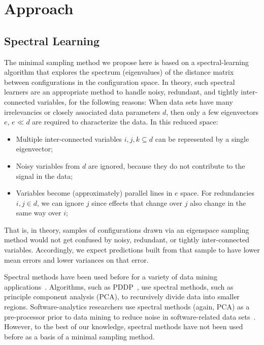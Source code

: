 \documentclass[smallextended]{svjour3}       %
\begin{document}
 \section{Approach}

\subsection{Spectral Learning}\label{sect:spect}

The minimal sampling method we propose here is based on a spectral-learning algorithm
that  explores the spectrum (eigenvalues) of the distance matrix between  configurations in the configuration space.
In theory, such spectral learners are an appropriate method to handle noisy, redundant, and tightly inter-connected variables, for the following reasons:
When data sets have many irrelevancies or closely associated data parameters $d$, then
only a few eigenvectors $e$, $e \ll d$  are required to characterize the data.
In this reduced space:
\begin{itemize}
\item
Multiple inter-connected variables $i,j,k \subseteq d$ can be represented
by a single eigenvector;
\item
Noisy variables from $d$ are
ignored, because they  do not contribute to the signal in the data;
\item
Variables  become (approximately) parallel lines
in $e$ space. For  redundancies \mbox{$i,j \in d$}, we
can ignore $j$
since effects that change over $j$ also
change in the same way over $i$;
\end{itemize}
That is, in theory, samples of configurations drawn via an eigenspace sampling method
would not get confused by noisy, redundant, or tightly inter-connected variables. Accordingly,
we expect predictions built from that sample to have  lower mean errors and lower variances on that error.

Spectral methods have been used before for a variety of data mining applications~\cite{kamvar2003spectral}.
Algorithms, such as PDDP~\cite{boley98}, use spectral methods, such as principle component analysis (PCA), to
recursively divide data into smaller regions.  Software-analytics researchers use spectral methods (again, PCA) as a pre-processor prior to data mining  to reduce noise in software-related data sets~\cite{theisen2015approximating}.
However, to the best of our knowledge, spectral methods have not been used before as a basis of a minimal sampling method.
\end{document}
